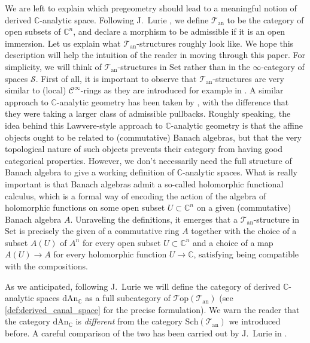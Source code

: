 \documentclass[12pt,a4paper,reqno]{amsart}
\theoremstyle{plain}
\theoremstyle{definition}
\theoremstyle{remark}
\numberwithin{equation}{section}
\begin{document}
We are left to explain which pregeometry should lead to a meaningful notion of derived {$\mathbb C$-analytic\xspace} space.
Following J.\ Lurie \cite[11.2, 11.3]{DAG-IX}, we define ${{\mathcal T}_{\mathrm{an}}}$ to be the category of open subsets of $\mathbb C^n$, and declare a morphism to be admissible if it is an open immersion. Let us explain what ${{\mathcal T}_{\mathrm{an}}}$-structures roughly look like. We hope this description will help the intuition of the reader in moving through this paper. For simplicity, we will think of ${{\mathcal T}_{\mathrm{an}}}$-structures in ${\mathrm{Set}}$ rather than in the $\infty$-category of spaces ${\mathcal S}$.
First of all, it is important to observe that ${{\mathcal T}_{\mathrm{an}}}$-structures are very similar to (local) ${\mathcal C}^\infty$-rings as they are introduced for example in \cite{Spivak_Derived_smooth_manifolds}. A similar approach to {$\mathbb C$-analytic\xspace} geometry has been taken by \cite{Dubuc_Taubin}, with the difference that they were taking a larger class of admissible pullbacks.
Roughly speaking, the idea behind this Lawvere-style approach to {$\mathbb C$-analytic\xspace} geometry is that the affine objects ought to be related to (commutative) Banach algebras, but that the very topological nature of such objects prevents their category from having good categorical properties.
However, we don't necessarily need the full structure of Banach algebra to give a working definition of {$\mathbb C$-analytic\xspace} spaces. What is really important is that Banach algebras admit a so-called holomorphic functional calculus, which is a formal way of encoding the action of the algebra of holomorphic functions on some open subset $U \subset \mathbb  C^n$ on a given (commutative) Banach algebra $A$.
Unraveling the definitions, it emerges that a ${{\mathcal T}_{\mathrm{an}}}$-structure in ${\mathrm{Set}}$ is precisely the given of a commutative ring $A$ together with the choice of a subset $A(U)$ of $A^n$ for every open subset $U \subset \mathbb C^n$ and a choice of a map $A(U) \to A$ for every holomorphic function $U \to \mathbb C$, satisfying being compatible with the compositions.

As we anticipated, following J.\ Lurie we will define the category of derived {$\mathbb C$-analytic\xspace} spaces ${\mathrm{dAn}_{\mathbb C}}$ as a full subcategory of ${\mathcal T\mathrm{op}}({{\mathcal T}_{\mathrm{an}}})$ (see \cref{def:derived_canal_space} for the precise formulation). We warn the reader that the category ${\mathrm{dAn}_{\mathbb C}}$ is \emph{different} from the category ${\mathrm{Sch}}({{\mathcal T}_{\mathrm{an}}})$ we introduced before. A careful comparison of the two has been carried out by J.\ Lurie in \cite[Corollary 12.22, Proposition 12.23]{DAG-IX}.
\end{document}
